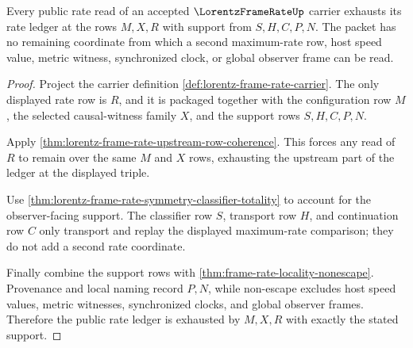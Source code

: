 \begin{theorem}
\label{thm:lorentz-frame-rate-rate-row-ledger-exhaustion}
Every public rate read of an accepted $\LorentzFrameRateUp$ carrier exhausts its rate ledger at the rows $M,X,R$ with support from $S,H,C,P,N$. The packet has no remaining coordinate from which a second maximum-rate row, host speed value, metric witness, synchronized clock, or global observer frame can be read.
\end{theorem}
\begin{proof}
Project the carrier definition \autoref{def:lorentz-frame-rate-carrier}. The only displayed rate row is $R$, and it is packaged together with the configuration row $M$, the selected causal-witness family $X$, and the support rows $S,H,C,P,N$.

Apply \autoref{thm:lorentz-frame-rate-upstream-row-coherence}. This forces any read of $R$ to remain over the same $M$ and $X$ rows, exhausting the upstream part of the ledger at the displayed triple.

Use \autoref{thm:lorentz-frame-rate-symmetry-classifier-totality} to account for the observer-facing support. The classifier row $S$, transport row $H$, and continuation row $C$ only transport and replay the displayed maximum-rate comparison; they do not add a second rate coordinate.

Finally combine the support rows with \autoref{thm:frame-rate-locality-nonescape}. Provenance and local naming record $P,N$, while non-escape excludes host speed values, metric witnesses, synchronized clocks, and global observer frames. Therefore the public rate ledger is exhausted by $M,X,R$ with exactly the stated support.
\end{proof}

